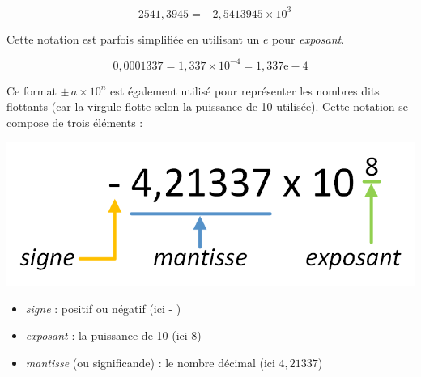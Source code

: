 \documentclass[11pt,a4paper]{article}
\begin{document}
\bigskip

\begin{equation*}
-2541,3945 = -2,5413945 \times 10^{3}
\label{equation:1-Notation-Scientifique}
\end{equation*}

\bigskip

Cette notation est parfois simplifiée en utilisant un $ e $ pour \textit{exposant}.

\bigskip

\begin{equation*}
0,0001337 = 1,337 \times 10^{-4} = 1,337\text{e}-4
\label{equation:2-Notation-Scientifique}
\end{equation*}

\bigskip

Ce format $ \pm \, a \times 10^{n} $ est également utilisé pour représenter les nombres dits flottants (car la virgule \og flotte \fg{} selon la puissance de 10 utilisée).
Cette notation se compose de trois éléments :

\bigskip


\begin{center}
\includegraphics[scale=0.75]{img/flottants/floats_parties.png}
\end{center}

\bigskip

\begin{itemize}
\item \textit{signe} : positif ou négatif (ici \og - \fg{})
\item \textit{exposant} : la puissance de 10 (ici $ 8 $)
\item \textit{mantisse} (ou significande) : le nombre décimal (ici $ 4,21337 $)
\end{itemize}
\end{document}
